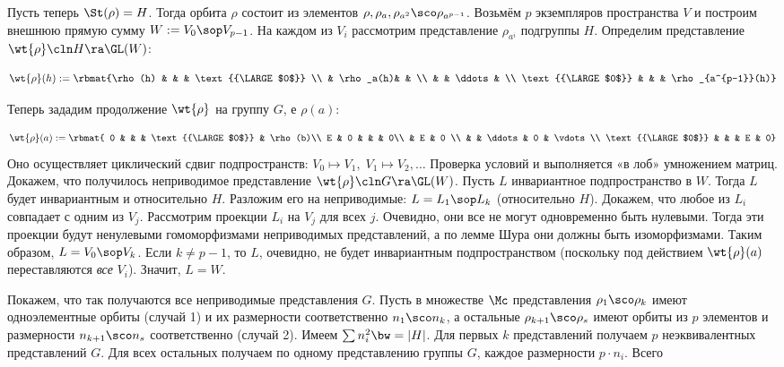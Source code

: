 \documentclass[a4paper]{article}
\begin{document}
Пусть теперь $\St(\rho)=H$. Тогда орбита $\rho$ состоит из элементов $\rho, \rho_a, \rho_{a^2} \sco
\rho_{a^{p-1}}$.  Возьмём $p$ экземпляров пространства $V$ и построим внешнюю прямую сумму $W:=V_0 \sop
V_{p-1}$. На каждом из $V_i$ рассмотрим представление $\rho_{a^i}$  подгруппы $H$. Определим представление
$\wt{\rho}\cln H \ra \GL(W)$:

$$\wt{\rho}(h):=\rbmat{\rho(h) & & & \text{{\LARGE $0$}} \\ & \rho_a(h)&  & \\ & & \ddots & \\ \text{{\LARGE $0$}} & & & \rho_{a^{p-1}}(h)}$$

Теперь зададим продолжение $\wt{\rho}$ на группу $G$, е $\rho(a)$:

$$\wt{\rho}(a):=\rbmat{
0 &   &  & \text{{\LARGE $0$}} &  \rho(b)\\
E & 0 &  & & 0\\
  & E & 0  \\
& & \ddots & 0 & \vdots \\
\text{{\LARGE $0$}} & & & E & 0}$$ Оно осуществляет циклический сдвиг подпространств: $V_0 \mapsto V_1, \;
V_1 \mapsto V_2, \ldots$  Проверка условий  и  выполняется «в лоб» умножением матриц. Докажем,
что получилось неприводимое представление $\wt{\rho}\cln G \ra \GL(W)$. Пусть $L$ инвариантное
подпространство в $W$. Тогда $L$  будет инвариантным и относительно $H$. Разложим его на неприводимые: $L=L_1
\sop L_k$ (относительно $H$). Докажем, что любое из  $L_i$ совпадает с одним из $V_j$. Рассмотрим проекции
$L_i$ на $V_j$ для всех $j$. Очевидно, они все не могут одновременно быть нулевыми. Тогда эти проекции будут
ненулевыми гомоморфизмами неприводимых представлений, а по лемме Шура они должны быть изоморфизмами. Таким
образом, $L=V_0 \sop V_k$. Если $k \neq p-1$, то $L$, очевидно, не будет инвариантным подпространством
(поскольку под действием $\wt{\rho}(a)$ переставляются \emph{все} $V_i$). Значит, $L=W$.

Покажем, что так получаются все неприводимые представления $G$. Пусть в множестве $\Mc$ представления
$\rho_1 \sco \rho_k$ имеют одноэлементные орбиты (случай 1) и их размерности соответственно $n_1 \sco n_k$, а
остальные $\rho_{k+1} \sco \rho_s$ имеют орбиты из $p$ элементов и размерности $n_{k+1} \sco n_s$
соответственно (случай 2). Имеем $\sum n_i^2\bw=|H|$. Для первых $k$ представлений получаем $p$ неэквивалентных
представлений $G$. Для всех остальных получаем по одному представлению группы $G$, каждое размерности $p \cdot n_i$. Всего
\end{document}
